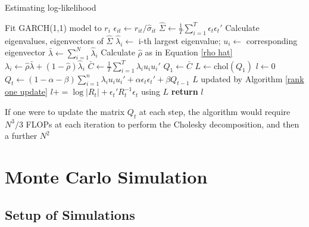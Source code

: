 \documentclass{article} %
\numberwithin{equation}{section} %
\numberwithin{figure}{section} %
\numberwithin{table}{section} %
\begin{document}
\begin{algorithm}[h]
\caption{Estimating log-likelihood}\label{alg: loglik}
\begin{algorithmic}[1]
\State Fit GARCH(1,1) model to $r_i$
\State $\epsilon_{it} \gets r_{it} / \hat{\sigma}_{it}$
\EndFor
\State $\hat{\Sigma} \gets \frac{1}{T}\sum\limits_{i=1}^T \epsilon_t \epsilon_t'$
\State Calculate eigenvalues, eigenvectors of $\hat{\Sigma}$
\State $\hat{\lambda}_i \gets$ i-th largest eigenvalue; $u_i \gets$ corresponding eigenvector
\State $\bar{\lambda} \gets \sum\limits_{i = 1}^N \hat{\lambda}_i$
\State Calculate $\hat{\rho}$ as in Equation \ref{rho hat}
\State $\lambda_i \gets \hat{\rho}\bar{\lambda} + (1 - \hat{\rho})\hat{\lambda}_i$
\EndFor
\State $\bar{C} \gets \frac{1}{T} \sum\limits_{i = 1}^{T} \lambda_i u_i u_i'$
\State $Q_1 \gets \bar{C}$
\State $L \gets \text{chol}(Q_1)$
\State $l \gets 0$
\State $Q_{t} \gets (1 - \alpha - \beta) \sum\limits_{i = 1}^n \lambda_i u_i u_i' + \alpha \epsilon_t \epsilon_t' + \beta Q_{t-1}$
\State $L$ updated by Algorithm \ref{rank one update}
\State $l += \log{|R_t|} + \epsilon_t'R_t^{-1}\epsilon_t$ using $L$
\EndFor
\State \textbf{return} $l$
\EndProcedure
\end{algorithmic}
\end{algorithm}

If one were to update the matrix $Q_t$ at each step, the algorithm would require $N^3/3$ FLOPs at each iteration to perform the Cholesky decomposition, and then a further $N^2$


\section{Monte Carlo Simulation}

\subsection{Setup of Simulations}
\end{document}
